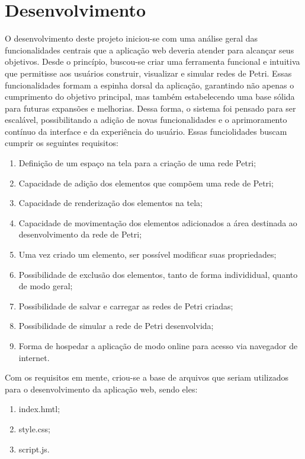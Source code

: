 \documentclass[
	12pt,				%
	openright,			%
	oneside,			%
	a4paper,			%
	english,			%
	brazil				%
	]{abntex2}
\begin{document}
\chapter{Desenvolvimento} \label{cap:desenvolvimento}

O desenvolvimento deste projeto iniciou-se com uma análise geral das funcionalidades centrais que a aplicação web deveria atender para alcançar seus objetivos. Desde o princípio, buscou-se criar uma ferramenta funcional e intuitiva que permitisse aos usuários construir, visualizar e simular redes de Petri. Essas funcionalidades formam a espinha dorsal da aplicação, garantindo não apenas o cumprimento do objetivo principal, mas também estabelecendo uma base sólida para futuras expansões e melhorias. Dessa forma, o sistema foi pensado para ser escalável, possibilitando a adição de novas funcionalidades e o aprimoramento contínuo da interface e da experiência do usuário. Essas funciolidades buscam cumprir os seguintes requisitos: 

\begin{enumerate}
	\item Definição de um espaço na tela para a criação de uma rede Petri;
	\item Capacidade de adição dos elementos que compõem uma rede de Petri;
	\item Capacidade de renderização dos elementos na tela;
	\item Capacidade de movimentação dos elementos adicionados a área destinada ao desenvolvimento da rede de Petri;
	\item Uma vez criado um elemento, ser possível modificar suas propriedades;
	\item Possibilidade de exclusão dos elementos, tanto de forma individidual, quanto de modo geral;
	\item Possibilidade de salvar e carregar as redes de Petri criadas;
	\item Possibilidade de simular a rede de Petri desenvolvida;
	\item Forma de hospedar a aplicação de modo online para acesso via navegador de internet.
\end{enumerate}

Com os requisitos em mente, criou-se a base de arquivos que seriam utilizados para o desenvolvimento da aplicação web, sendo eles: 

\begin{enumerate}
	\item index.hmtl;
	\item style.css;
	\item script.js.
\end{enumerate}
\end{document}
